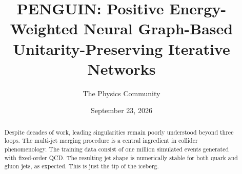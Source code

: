\documentclass[11pt]{article}
\title{PENGUIN: Positive Energy-Weighted Neural Graph-Based Unitarity-Preserving Iterative Networks}
\author{The Physics Community}
\date{September 23, 2026}
\begin{document}
\maketitle
\begin{abstract}
Despite decades of work, leading singularities remain poorly understood
beyond three loops. The multi-jet merging procedure is a central
ingredient in collider phenomenology. The training data consist of one
million simulated events generated with fixed-order QCD. The resulting
jet shape is numerically stable for both quark and gluon jets, as
expected. This is just the tip of the iceberg.
\end{abstract}
\tableofcontents




\nocite{*}


\end{document}
